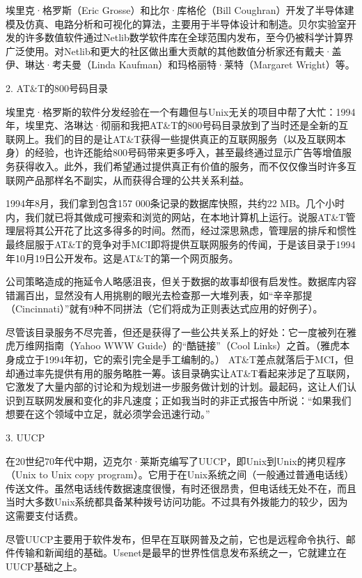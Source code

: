 \documentclass[a4paper,12pt,UTF8,twoside]{ctexbook}
\begin{document}
{{埃里克·格罗斯（Eric Grosse）和比尔·库格伦（Bill Coughran）开发了半导体建模及仿真、电路分析和可视化的算法，主要用于半导体设计和制造。贝尔实验室开发的许多数值软件通过Netlib数学软件库在全球范围内发布，至今仍被科学计算界广泛使用。对Netlib和更大的社区做出重大贡献的其他数值分析家还有戴夫·盖伊、琳达·考夫曼（Linda Kaufman）和玛格丽特·莱特（Margaret Wright）等。





2. AT\&T的800号码目录


埃里克·格罗斯的软件分发经验在一个有趣但与Unix无关的项目中帮了大忙：1994年，埃里克、洛琳达·彻丽和我把AT\&T的800号码目录放到了当时还是全新的互联网上。我们的目的是让AT\&T获得一些提供真正的互联网服务（以及互联网本身）的经验，也许还能给800号码带来更多呼入，甚至最终通过显示广告等增值服务获得收入。此外，我们希望通过提供真正有价值的服务，而不仅仅像当时许多互联网产品那样名不副实，从而获得合理的公共关系利益。

1994年8月，我们拿到包含157 000条记录的数据库快照，共约22 MB。几个小时内，我们就已将其做成可搜索和浏览的网站，在本地计算机上运行。说服AT\&T管理层将其公开花了比这多得多的时间。然而，经过深思熟虑，管理层的排斥和惯性最终屈服于AT\&T的竞争对手MCI即将提供互联网服务的传闻，于是该目录于1994年10月19日公开发布。这是AT\&T的第一个网页服务。

公司策略造成的拖延令人略感沮丧，但关于数据的故事却很有启发性。数据库内容错漏百出，显然没有人用挑剔的眼光去检查那一大堆列表，如“辛辛那提（Cincinnati）”就有9种不同拼法（它们将成为正则表达式应用的好例子）。

尽管该目录服务不尽完善，但还是获得了一些公共关系上的好处：它一度被列在雅虎万维网指南（Yahoo WWW Guide）的“酷链接”（Cool Links）之首。（雅虎本身成立于1994年初，它的索引完全是手工编制的。） AT\&T差点就落后于MCI，但却通过率先提供有用的服务略胜一筹。该目录确实让AT\&T看起来涉足了互联网，它激发了大量内部的讨论和为规划进一步服务做计划的计划。最起码，这让人们认识到互联网发展和变化的非凡速度；正如我当时的非正式报告中所说：“如果我们想要在这个领域中立足，就必须学会迅速行动。”





3. UUCP


在20世纪70年代中期，迈克尔·莱斯克编写了UUCP，即Unix到Unix的拷贝程序（Unix to Unix copy program）。它用于在Unix系统之间（一般通过普通电话线）传送文件。虽然电话线传数据速度很慢，有时还很昂贵，但电话线无处不在，而且当时大多数Unix系统都具备某种拨号访问功能。不过具有外拨能力的较少，因为这需要支付话费。

尽管UUCP主要用于软件发布，但早在互联网普及之前，它也是远程命令执行、邮件传输和新闻组的基础。Usenet是最早的世界性信息发布系统之一，它就建立在UUCP基础之上。

}}
\end{document}
